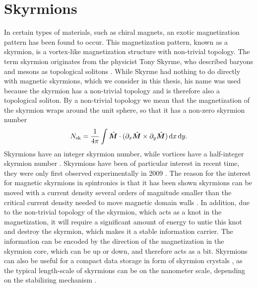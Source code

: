 \section{Skyrmions} \label{sec:Skyrmions}
In certain types of materials, such as chiral magnets, an exotic magnetization pattern has been found to occur. This magnetization pattern, known as a skyrmion, is a vortex-like magnetization structure with non-trivial topology. The term skyrmion originates from the physicist Tony Skyrme, who described baryons and mesons as topological solitons \cite{Skyrme1962}. While Skyrme had nothing to do directly with magnetic skyrmions, which we consider in this thesis, his name was used because the skyrmion has a non-trivial topology and is therefore also a topological soliton. By a non-trivial topology we mean that the magnetization of the skyrmion wraps around the unit sphere, so that it has a non-zero skyrmion number \cite{Heinze2011}
\begin{align}
\label{eq:SkyrmionNumber}
N_{\textrm{sk}} = \frac{1}{4\pi}\int \mathbold{\hat{M}}\cdot(\partial_x \mathbold{\hat{M}} \times \partial_y \mathbold{\hat{M}}) \d x \d y.
\end{align}
Skyrmions have an integer skyrmion number, while vortices have a half-integer skyrmion number \cite{Tretiakov2007}. Skyrmions have been of particular interest in recent time, they were only first observed experimentally in 2009 \cite{Muhlbauer2009}. The reason for the interest for magnetic skyrmions in spintronics is that it has been shown skyrmions can be moved with a current density several orders of magnitude smaller than the critical current density needed to move magnetic domain walls \cite{Jonietz2010}. In addition, due to the non-trivial topology of the skyrmion, which acts as a knot in the magnetization, it will require a significant amount of energy to untie this knot and destroy the skyrmion, which makes it a stable information carrier. The information can be encoded by the direction of the magnetization in the skyrmion core, which can be up or down, and therefore acts as a bit. Skyrmions can also be useful for a compact data storage in form of skyrmion crystals \cite{Fert2013}, as the typical length-scale of skyrmions can be on the nanometer scale, depending on the stabilizing mechanism \cite{Nagaosa2013}. 

